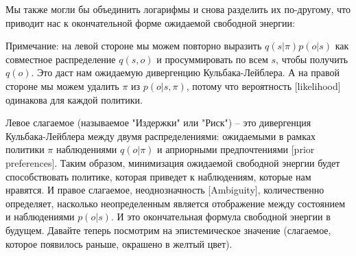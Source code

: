 \documentclass[twoside,leqno, 11pt]{article}
\begin{document}
	
	Мы также могли бы объединить логарифмы и снова разделить их по-другому, что приводит нас к окончательной форме ожидаемой свободной энергии:
	
	
	\begin{figure}[h]
	\end{figure}
	
	Примечание: на левой стороне мы можем повторно выразить $q(s|\pi) p(o|s)$ как совместное распределение $q(s,o)$ и просуммировать по всем $s$, чтобы получить $q(o)$. Это даст нам ожидаемую дивергенцию Кульбака-Лейблера. А на правой стороне мы можем удалить $\pi$ из $p(o|s,\pi)$, потому что вероятность [likelihood] одинакова для каждой политики.
	
	
	Левое слагаемое (называемое "Издержки" или "Риск") -- это дивергенция Кульбака-Лейблера между двумя распределениями: ожидаемыми в рамках политики $\pi$ наблюдениями $q(o|\pi)$ и априорными предпочтениями [prior preferences]. Таким образом, минимизация ожидаемой свободной энергии будет способствовать политике, которая приведет к наблюдениям, которые нам нравятся. И правое слагаемое, неоднозначность [Ambiguity], количественно определяет, насколько неопределенным является отображение между состоянием и наблюдениями $p(o|s)$. И это окончательная формула свободной энергии в будущем. Давайте теперь посмотрим на эпистемическое значение (слагаемое, которое появилось раньше, окрашено в желтый цвет).
	
\end{document}
